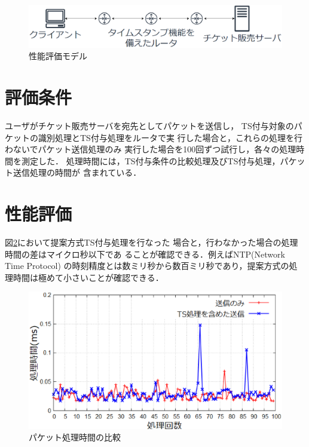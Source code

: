 \documentclass[a4j,11pt]{jreport}
\begin{document}
\begin{figure}[htbp]
  \centering
  \includegraphics[scale=0.5]{data/soturon_network_koseizu2.eps}
  \vspace{0mm}
  \caption{性能評価モデル}
  \label{fig:seinouhyouka_model}
\end{figure}

\section{評価条件}
ユーザがチケット販売サーバを宛先としてパケットを送信し，
TS付与対象のパケットの識別処理とTS付与処理をルータで実
行した場合と，これらの処理を行わないでパケット送信処理のみ
実行した場合を100回ずつ試行し，各々の処理時間を測定した．
処理時間には，TS付与条件の比較処理及びTS付与処理，パケット送信処理の時間が
含まれている．

\section{性能評価}
図\ref{fig:shori}において提案方式TS付与処理を行なった
場合と，行わなかった場合の処理時間の差はマイクロ秒以下であ
ることが確認できる．例えばNTP(Network Time Protocol)
の時刻精度とは数ミリ秒から数百ミリ秒であり，提案方式の処
理時間は極めて小さいことが確認できる．

\begin{figure}[htbp]
  \centering
  \includegraphics[scale=0.5]{data/soturon_shori_hikaku6.eps}
  \vspace{0mm}
  \caption{パケット処理時間の比較}
  \label{fig:shori}
\end{figure}
\end{document}
